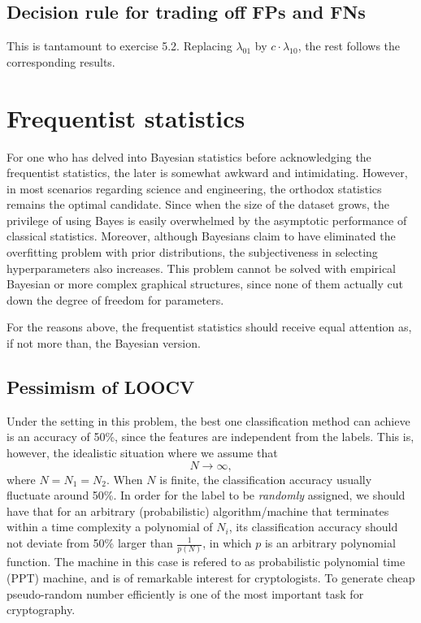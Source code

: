 \documentclass[UTF8]{ctexart}
\begin{document}
\subsection{Decision rule for trading off FPs and FNs}
This is tantamount to exercise 5.2.
Replacing $\lambda_{01}$ by $c\cdot \lambda_{10}$, the rest follows the corresponding results.


\newpage
\section{Frequentist statistics}
For one who has delved into Bayesian statistics before acknowledging the frequentist statistics, the later is somewhat awkward and intimidating.
However, in most scenarios regarding science and engineering, the orthodox statistics remains the optimal candidate.
Since when the size of the dataset grows, the privilege of using Bayes is easily overwhelmed by the asymptotic performance of classical statistics.
Moreover, although Bayesians claim to have eliminated the overfitting problem with prior distributions, the subjectiveness in selecting hyperparameters also increases.
This problem cannot be solved with empirical Bayesian or more complex graphical structures, since none of them actually cut down the degree of freedom for parameters.

For the reasons above, the frequentist statistics should receive equal attention as, if not more than, the Bayesian version.

\subsection{Pessimism of LOOCV}
Under the setting in this problem, the best one classification method can achieve is an accuracy of 50\%, since the features are independent from the labels.
This is, however, the idealistic situation where we assume that $$N\rightarrow \infty,$$
where $N=N_{1}=N_{2}$.
When $N$ is finite, the classification accuracy usually fluctuate around 50\%.
In order for the label to be \emph{randomly} assigned, we should have that for an arbitrary (probabilistic) algorithm/machine that terminates within a time complexity a polynomial of $N_{i}$, its classification accuracy should not deviate from 50\% larger than $\frac{1}{p(N)}$, in which $p$ is an arbitrary polynomial function.
The machine in this case is refered to as probabilistic polynomial time (PPT) machine, and is of remarkable interest for cryptologists.
To generate cheap pseudo-random number efficiently is one of the most important task for cryptography.
\end{document}
